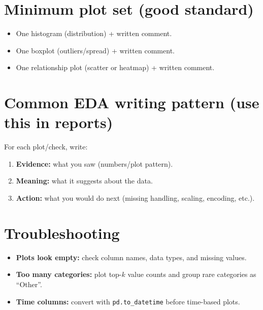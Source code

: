 \documentclass[11pt]{article}
\begin{document}
\section{Minimum plot set (good standard)}
\begin{itemize}[leftmargin=*]
  \item One histogram (distribution) + written comment.
  \item One boxplot (outliers/spread) + written comment.
  \item One relationship plot (scatter or heatmap) + written comment.
\end{itemize}

\section{Common EDA writing pattern (use this in reports)}
For each plot/check, write:
\begin{enumerate}[leftmargin=*]
  \item \textbf{Evidence:} what you saw (numbers/plot pattern).
  \item \textbf{Meaning:} what it suggests about the data.
  \item \textbf{Action:} what you would do next (missing handling, scaling, encoding, etc.).
\end{enumerate}

\section{Troubleshooting}
\begin{itemize}[leftmargin=*]
  \item \textbf{Plots look empty:} check column names, data types, and missing values.
  \item \textbf{Too many categories:} plot top-$k$ value counts and group rare categories as ``Other''.
  \item \textbf{Time columns:} convert with \texttt{pd.to\_datetime} before time-based plots.
\end{itemize}

\notesources{\AIMLLabSources}
\end{document}
